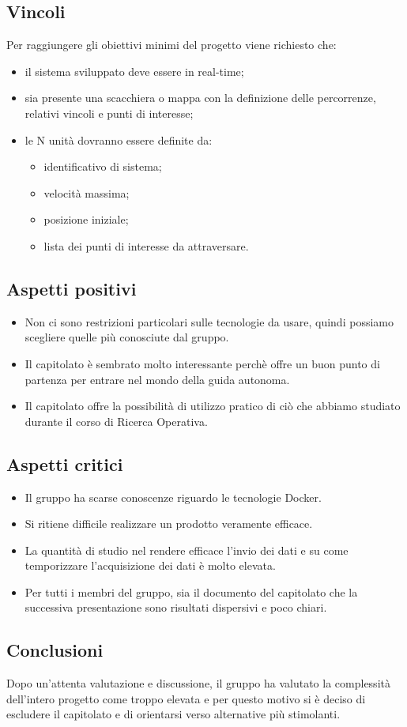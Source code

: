 \subsection{Vincoli}
Per raggiungere gli obiettivi minimi del progetto viene richiesto che:
\begin{itemize}
\item il sistema sviluppato deve essere in real-time;
\item sia presente una scacchiera o mappa con la definizione delle percorrenze, relativi vincoli e punti di interesse;
\item le N unità dovranno essere definite da:
	\begin{itemize}
	\item identificativo di sistema;
	\item velocità massima;
	\item posizione iniziale;
	\item lista dei punti di interesse da attraversare.
	\end{itemize}
\end{itemize}

\subsection{Aspetti positivi}
\begin{itemize}
	\item Non ci sono restrizioni particolari sulle tecnologie da usare, quindi possiamo scegliere quelle più conosciute dal gruppo.
	\item Il capitolato è sembrato molto interessante perchè offre un buon punto di partenza per entrare nel mondo della guida autonoma.
	\item Il capitolato offre la possibilità di utilizzo pratico di ciò che abbiamo studiato durante il corso di Ricerca Operativa.
\end{itemize}

\subsection{Aspetti critici}
\begin{itemize}
	\item Il gruppo ha scarse conoscenze riguardo le tecnologie Docker.
	\item Si ritiene difficile realizzare un prodotto veramente efficace.
	\item La quantità di studio nel rendere efficace l'invio dei dati e su come temporizzare l'acquisizione dei dati è molto elevata.
	\item Per tutti i membri del gruppo, sia il documento del capitolato che la successiva presentazione sono risultati dispersivi e poco chiari. 
\end{itemize}

\subsection{Conclusioni}
Dopo un'attenta valutazione e discussione, il gruppo ha valutato la complessità dell'intero progetto come troppo elevata e per questo motivo si è deciso di escludere il capitolato e di orientarsi verso alternative più stimolanti.
